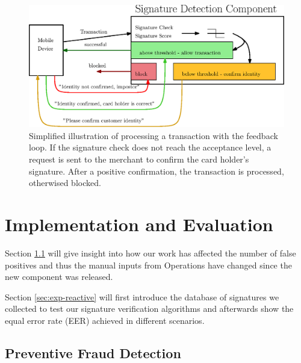 \documentclass[a4paper, oneside]{csthesis}
\begin{document}
\begin{figure}[tb]
    \begin{center}
        \includegraphics[width=1\textwidth]{figures/fb-loop2.eps}
    \end{center}
    \caption{Simplified illustration of processing a transaction with the feedback loop. If the signature check does not reach the acceptance level, a request is sent to the merchant to confirm the card holder's signature. After a positive confirmation, the transaction is processed, otherwised blocked.}
    \label{fig:fb-loop2}
\end{figure}













\chapter{Implementation and Evaluation}
\label{chp:experiments}



Section \ref{sec:exp-preventive} will give insight into how our work has affected the number of false positives and thus the manual inputs from Operations have changed since the new component was released.

Section \ref{sec:exp-reactive} will first introduce the database of signatures we collected to test our signature verification algorithms and afterwards show the equal error rate (EER) achieved in different scenarios.


\section{Preventive Fraud Detection}
\label{sec:exp-preventive}
\end{document}
